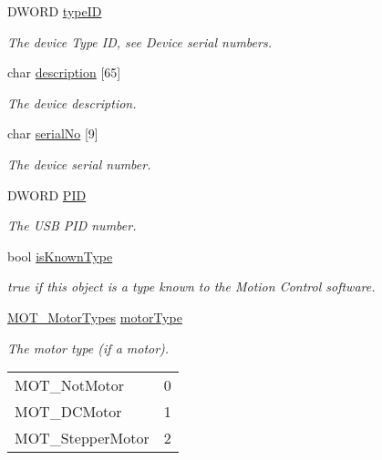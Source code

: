 \begin{DoxyCompactItemize}
\item 
D\+W\+O\+RD \hyperlink{struct_t_l_i___device_info_af48200700520b9f35e899443b91d4fb0}{type\+ID}
\begin{DoxyCompactList}\small\item\em The device Type ID, see Device serial numbers. \end{DoxyCompactList}\item 
char \hyperlink{struct_t_l_i___device_info_a7c6ebe1654de910ad7b6fc4bc6b43d21}{description} \mbox{[}65\mbox{]}
\begin{DoxyCompactList}\small\item\em The device description. \end{DoxyCompactList}\item 
char \hyperlink{struct_t_l_i___device_info_a2643f38643f2dda9a0054389fabb2b6a}{serial\+No} \mbox{[}9\mbox{]}
\begin{DoxyCompactList}\small\item\em The device serial number. \end{DoxyCompactList}\item 
D\+W\+O\+RD \hyperlink{struct_t_l_i___device_info_aa0901ef8505517e5c9fdd4d1b8b425b5}{P\+ID}
\begin{DoxyCompactList}\small\item\em The U\+SB P\+ID number. \end{DoxyCompactList}\item 
bool \hyperlink{struct_t_l_i___device_info_acdc14f666331a4036bda902ffd5bbbc9}{is\+Known\+Type}
\begin{DoxyCompactList}\small\item\em {\ttfamily true} if this object is a type known to the Motion Control software. \end{DoxyCompactList}\item 
\hyperlink{group___common_gac8faf0d1045d287ba4c1013ab2cfffca}{M\+O\+T\+\_\+\+Motor\+Types} \hyperlink{struct_t_l_i___device_info_aa6a3567c98f84b12884c75d69bcd21bf}{motor\+Type}
\begin{DoxyCompactList}\small\item\em The motor type (if a motor). \tabulinesep=1mm
\begin{longtabu} spread 0pt [c]{*2{|X[-1]}|}
\hline
M\+O\+T\+\_\+\+Not\+Motor&0 \\
M\+O\+T\+\_\+\+D\+C\+Motor&1 \\
M\+O\+T\+\_\+\+Stepper\+Motor&2 \\

\end{longtabu}
\end{DoxyCompactList}
\end{DoxyCompactItemize}
